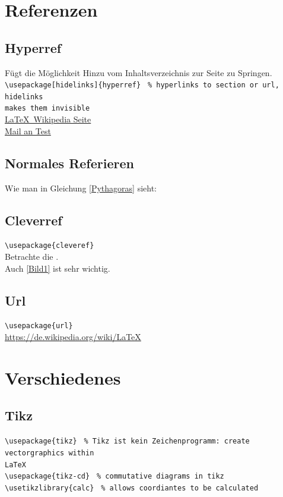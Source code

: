 \documentclass[titlepage, 11pt, a4paper,ngerman]{article}
\begin{document}
\section{Referenzen}

\subsection{Hyperref}

Fügt die Möglichkeit Hinzu vom Inhaltsverzeichnis zur Seite zu Springen.\\[10pt]
\verb|\usepackage[hidelinks]{hyperref}| \texttt{ \% hyperlinks to section or url, hidelinks \\ makes them invisible}\\[10pt]
\href{https://de.wikipedia.org/wiki/LaTeX}{\LaTeX \ Wikipedia Seite}\\
\href{mailto:test@example.net}{Mail an Test}

\subsection{Normales Referieren}

Wie man in Gleichung \ref{Pythagoras} sieht:

\subsection{Cleverref}

\verb|\usepackage{cleveref}|\\[10pt]
Betrachte die .\\ Auch \cref{Bild1} ist sehr wichtig.

\subsection{Url}

\verb|\usepackage{url}|\\[10pt]
\url{https://de.wikipedia.org/wiki/LaTeX}


\section{Verschiedenes}

\subsection{Tikz}

\verb|\usepackage{tikz}| \texttt{ \% Tikz ist kein Zeichenprogramm: create vectorgraphics within \\ LaTeX}\\
\verb|\usepackage{tikz-cd}| \texttt{ \% commutative diagrams in tikz}\\
\verb|\usetikzlibrary{calc}| \texttt{ \% allows coordiantes to be calculated}\\[10pt]
\end{document}
